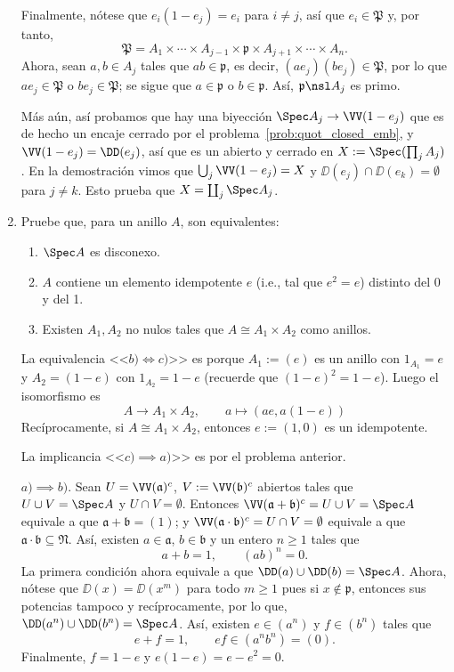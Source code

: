 \documentclass[11pt, reqno]{amsart}
\begin{document}
\begin{enumerate}
\begin{sol}
			Finalmente, nótese que $e_i(1 - e_j) = e_i$ para $i \ne j$, así que $e_i \in \mathfrak{P}$ y,
			por tanto,
			\[
				\mathfrak{P} = A_1 \times \cdots \times A_{j-1} \times \mathfrak{p} \times A_{j+1} \times
				\cdots \times A_n.
			\]
			Ahora, sean $a, b \in A_j$ tales que $ab \in \mathfrak{p}$, es decir, $(ae_j)(be_j) \in
			\mathfrak{P}$, por lo que $ae_j \in \mathfrak{P}$ o $be_j \in \mathfrak{P}$; se sigue que $a\in
			\mathfrak{p}$ o $b \in \mathfrak{p}$.
			Así, $\mathfrak{p} \nsl A_j$ es primo.

			Más aún, así probamos que hay una biyección $\Spec A_j \to \VV(1 - e_j)$ que es de hecho un
			encaje cerrado por el problema~\ref{prob:quot_closed_emb}, y $\VV(1 - e_j) = \DD(e_j)$, así que
			es un abierto y cerrado en $X := \Spec(\prod_{j} A_j)$.
			En la demostración vimos que $\bigcup_{j} \VV(1 - e_j) = X$ y $\DD(e_j) \cap \DD(e_k) =
			\emptyset$ para $j \ne k$.
			Esto prueba que $X = \coprod_{j} \Spec A_j$.
		\end{sol}

	\item Pruebe que, para un anillo $A$, son equivalentes:
		\begin{enumerate}
			\item $\Spec A$ es disconexo.
			\item $A$ contiene un elemento idempotente $e$ (i.e., tal que $e^2 = e$) distinto del 0 y del 1.
			\item Existen $A_1, A_2$ no nulos tales que $A \cong A_1 \times A_2$ como anillos.
		\end{enumerate}

		\begin{sol}
			La equivalencia <<$b) \iff c)$>> es porque $A_1 := (e)$ es un anillo con $1_{A_1} = e$ y $A_2 =
			(1 - e)$ con $1_{A_2} = 1 - e$ (recuerde que $(1-e)^2 = 1-e$).
			Luego el isomorfismo es
			\[
				A \longrightarrow A_1\times A_2, \qquad a \longmapsto (ae, a(1-e))
			\]
			Recíprocamente, si $A \cong A_1\times A_2$, entonces $e := (1, 0)$ es un idempotente.

			La implicancia <<$c) \implies a)$>> es por el problema anterior.

			$a) \implies b)$.
			Sean $U = \VV(\mathfrak{a})^c$, $V := \VV(\mathfrak{b})^c$ abiertos tales que $U \cup V = \Spec
			A$ y $U \cap V = \emptyset$.
			Entonces $\VV(\mathfrak{a + b})^c = U \cup V = \Spec A$ equivale a que $\mathfrak{a + b} = (1)$;
			y $\VV(\mathfrak{a\cdot b})^c = U \cap V = \emptyset$ equivale a que $\mathfrak{a\cdot b}
			\subseteq \mathfrak{N}$.
			Así, existen $a \in \mathfrak{a}$, $b \in \mathfrak{b}$ y un entero $n \ge 1$ tales que
			\[
				a + b = 1, \qquad (ab)^n = 0.
			\]
			La primera condición ahora equivale a que $\DD(a) \cup \DD(b) = \Spec A$.
			Ahora, nótese que $\DD(x) = \DD(x^m)$ para todo $m \ge 1$ pues si $x \notin \mathfrak{p}$,
			entonces sus potencias tampoco y recíprocamente, por lo que, $\DD(a^n) \cup \DD(b^n) = \Spec A$.
			Así, existen $e \in (a^n)$ y $f \in (b^n)$ tales que
			\[
				e + f = 1, \qquad ef \in (a^nb^n) = (0).
			\]
			Finalmente, $f = 1 - e$ y $e(1-e) = e - e^2 = 0$.
		\end{sol}


\end{enumerate}
\end{document}
